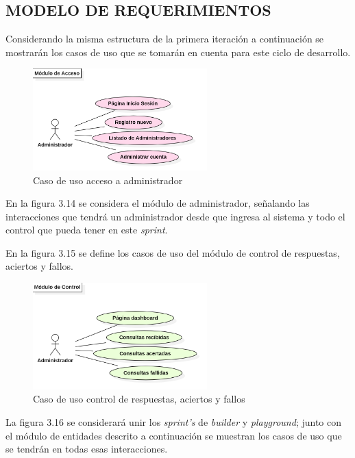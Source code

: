 \documentclass[letter, openright, 12pt]{book}
\begin{document}
\subsection{MODELO DE REQUERIMIENTOS}

Considerando la misma estructura de la primera iteración a continuación se mostrarán los casos de uso que se tomarán en cuenta para este ciclo de desarrollo. 

\begin{figure}[H]
\centering
\includegraphics[width=0.6\textwidth]{figura3_14}
 \caption{Caso de uso acceso a administrador}
\label{fig:figura3_14}
\end{figure}

En la figura 3.14 se considera el módulo de administrador, señalando las interacciones que tendrá un administrador desde que ingresa al sistema y todo el control que pueda tener en este {\it sprint}. 
\par En la figura 3.15 se define los casos de uso del módulo de control de respuestas, aciertos y fallos. 

\begin{figure}[H]
\centering
\includegraphics[width=0.6\textwidth]{figura3_15}
 \caption{Caso de uso control de respuestas, aciertos y fallos}
\label{fig:figura3_15}
\end{figure}

La figura 3.16 se considerará unir los {\it sprint's} de {\it builder} y {\it playground}; junto con el módulo de entidades descrito a continuación se muestran los casos de uso que se tendrán en todas esas interacciones. 
\end{document}
